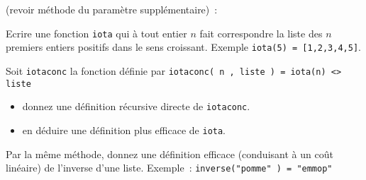 (revoir méthode du paramètre supplémentaire)~:

\begin{exercice}
Ecrire une fonction \texttt{iota} qui à tout entier $n$ fait
correspondre la liste des $n$ premiers entiers positifs dans le sens
croissant.  Exemple \verb/iota(5) = [1,2,3,4,5]/.

Soit \texttt{iotaconc} la fonction définie par 
\verb+iotaconc( n , liste ) = iota(n) <> liste +
\begin{itemize}
\item donnez une définition récursive directe de \texttt{iotaconc}.
\item en déduire une définition plus efficace de \texttt{iota}.
\end{itemize}
\end{exercice}
	
\begin{exercice}
Par la m\^eme méthode, donnez une définition efficace (conduisant à un
	co\^ut linéaire) de l'inverse d'une liste. Exemple~:
	\verb+inverse("pomme" ) = "emmop"+
\end{exercice}


